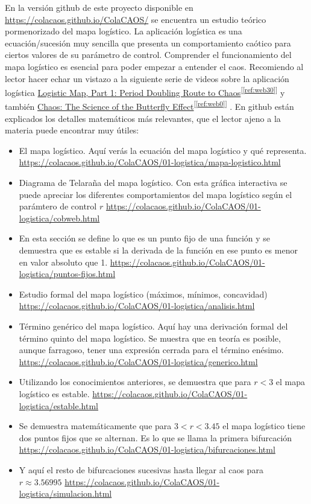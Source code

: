 \documentclass[
  10pt,
  a4paper,
  DIV=11,
  numbers=noendperiod,
  open=any]{scrreprt}
\numberwithin{equation}{chapter}
\numberwithin{equation}{section}
\renewcommand{\[}{\begin{equation}}
\renewcommand{\]}{\end{equation}}
\newcommand{\refweb}[3]{%
  \href{#1}{#2}\textsuperscript{[\ref{ref:#3}]}%
}
\begin{document}
En la versión github de este proyecto disponible en \href{https://colacaos.github.io/ColaCAOS/}{https://colacaos.github.io/ColaCAOS/} se encuentra un estudio teórico pormenorizado del mapa logístico. La aplicación logística es una ecuación/sucesión muy sencilla que presenta un comportamiento caótico para ciertos valores de su parámetro de control. Comprender el funcionamiento del mapa logístico es esencial para poder empezar a entender el caos. Recomiendo al lector hacer echar un vistazo a la siguiente serie de videos sobre la aplicación logística \refweb{https://www.youtube.com/watch?v=PVo1mHnU7WU&t=32s}{Logistic Map, Part 1: Period Doubling Route to Chaos}{web30} y también \refweb{https://www.youtube.com/watch?v=fDek6cYijxI}{Chaos: The Science of the Butterfly Effect}{web0} . En github están explicados los detalles matemáticos más relevantes, que el lector ajeno a la materia puede encontrar muy útiles:


\begin{itemize}
\item
  El mapa logístico. Aquí verás la ecuación del mapa logístico y qué representa.
  \url{https://colacaos.github.io/ColaCAOS/01-logistica/mapa-logistico.html}
\item
  Diagrama de Telaraña del mapa logístico. Con esta gráfica interactiva se puede apreciar los diferentes comportamientos del mapa logístico según el parámtero de control $r$
  \url{https://colacaos.github.io/ColaCAOS/01-logistica/cobweb.html}
\item
  En esta sección se define lo que es un punto fijo de una función y se demuestra que es estable si la derivada de la función en ese punto es menor en valor absoluto que 1. 
  \url{https://colacaos.github.io/ColaCAOS/01-logistica/puntos-fijos.html}
\item
  Estudio formal del mapa logístico (máximos, mínimos, concavidad)
  \url{https://colacaos.github.io/ColaCAOS/01-logistica/analisis.html}
\item
  Término genérico del mapa logístico. Aquí hay una derivación formal del término quinto del mapa logístico. Se muestra que en teoría es posible, aunque farragoso, tener una expresión cerrada para el término enésimo. 
  \url{https://colacaos.github.io/ColaCAOS/01-logistica/generico.html}
\item
  Utilizando los conocimientos anteriores, se demuestra que para $r < 3$ el mapa logístico es estable. 
  \url{https://colacaos.github.io/ColaCAOS/01-logistica/estable.html}
\item
  Se demuestra matemáticamente que para  $3 < r < 3.45$ el mapa logístico tiene dos puntos fijos que se alternan. Es lo que se llama la primera bifurcación
  \url{https://colacaos.github.io/ColaCAOS/01-logistica/bifurcaciones.html} 
\item
  Y aquí el resto de bifurcaciones sucesivas hasta llegar al caos para $r \approx 3.56995$  
  \url{https://colacaos.github.io/ColaCAOS/01-logistica/simulacion.html} 
\end{itemize}
\end{document}
